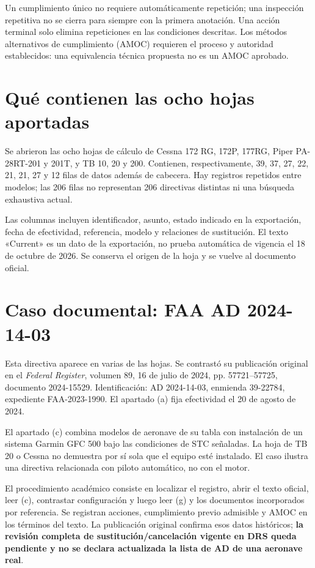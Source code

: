 Un cumplimiento único no requiere automáticamente repetición; una inspección repetitiva no se cierra para siempre con la primera anotación. Una acción terminal solo elimina repeticiones en las condiciones descritas. Los métodos alternativos de cumplimiento (AMOC) requieren el proceso y autoridad establecidos: una equivalencia técnica propuesta no es un AMOC aprobado.
\section{Qué contienen las ocho hojas aportadas}
Se abrieron las ocho hojas de cálculo de Cessna 172 RG, 172P, 177RG, Piper PA-28RT-201 y 201T, y TB 10, 20 y 200. Contienen, respectivamente, 39, 37, 27, 22, 21, 21, 27 y 12 filas de datos además de cabecera. Hay registros repetidos entre modelos; las 206 filas no representan 206 directivas distintas ni una búsqueda exhaustiva actual.

Las columnas incluyen identificador, asunto, estado indicado en la exportación, fecha de efectividad, referencia, modelo y relaciones de sustitución. El texto «Current» es un dato de la exportación, no prueba automática de vigencia el 18 de octubre de 2026. Se conserva el origen de la hoja y se vuelve al documento oficial.
\section{Caso documental: FAA AD 2024-14-03}
Esta directiva aparece en varias de las hojas. Se contrastó su publicación original en el \textit{Federal Register}, volumen 89, 16 de julio de 2024, pp. 57721--57725, documento 2024-15529. Identificación: AD 2024-14-03, enmienda 39-22784, expediente FAA-2023-1990. El apartado (a) fija efectividad el 20 de agosto de 2024.

El apartado (c) combina modelos de aeronave de su tabla con instalación de un sistema Garmin GFC 500 bajo las condiciones de STC señaladas. La hoja de TB 20 o Cessna no demuestra por sí sola que el equipo esté instalado. El caso ilustra una directiva relacionada con piloto automático, no con el motor.

El procedimiento académico consiste en localizar el registro, abrir el texto oficial, leer (c), contrastar configuración y luego leer (g) y los documentos incorporados por referencia. Se registran acciones, cumplimiento previo admisible y AMOC en los términos del texto. La publicación original confirma esos datos históricos; \textbf{la revisión completa de sustitución/cancelación vigente en DRS queda pendiente y no se declara actualizada la lista de AD de una aeronave real}.
